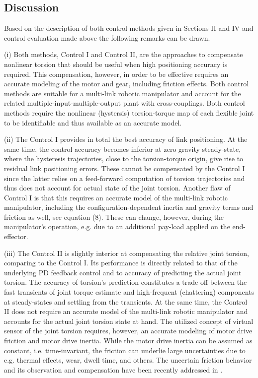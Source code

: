 \documentclass[a4paper, 10pt, conference]{ieeeconf}
\begin{document}
\subsection*{Discussion} \label{sec:6:3}


Based on the description of both control methods given in Sections
II and IV and control evaluation made above the following remarks
can be drawn.

(i) Both methods, Control I and Control II, are the approaches to
compensate nonlinear torsion that should be useful when high
positioning accuracy is required. This compensation, however, in
order to be effective requires an accurate modeling of the motor
and gear, including friction effects. Both control methods are
suitable for a multi-link robotic manipulator and account for the
related multiple-input-multiple-output plant with cross-couplings.
Both control methods require the nonlinear (hystersis)
torsion-torque map of each flexible joint to be identifiable and
thus available as an accurate model.

(ii) The Control I provides in total the best accuracy of link
positioning. At the same time, the control accuracy becomes
inferior at zero gravity steady-state, where the hysteresis
trajectories, close to the torsion-torque origin, give rise to
residual link positioning errors. These cannot be compensated by
the Control I since the latter relies on a feed-forward
computation of torsion trajectories and thus does not account for
actual state of the joint torsion. Another flaw of Control I is
that this requires an accurate model of the multi-link robotic
manipulator, including the configuration-dependent inertia and
gravity terms and friction as well, see equation (8). These can
change, however, during the manipulator's operation, e.g. due to
an additional pay-load applied on the end-effector.

(iii) The Control II is slightly interior at compensating the
relative joint torsion, comparing to the Control I. Its
performance is directly related to that of the underlying PD
feedback control and to accuracy of predicting the actual joint
torsion. The accuracy of torsion's prediction constitutes a
trade-off between the fast transients of joint torque estimate and
high-frequent (chattering) components at steady-states and
settling from the transients. At the same time, the Control II
does not require an accurate model of the multi-link robotic
manipulator and accounts for the actual joint torsion state at
hand. The utilized concept of virtual sensor of the joint torsion
requires, however, an accurate modeling of motor drive friction
and motor drive inertia. While the motor drive inertia can be
assumed as constant, i.e. time-invariant, the friction can
underlie large uncertainties due to e.g. thermal effects, wear,
dwell time, and others. The uncertain friction behavior and its
observation and compensation have been recently addressed in
\cite{Ruder2015f}.
\end{document}
